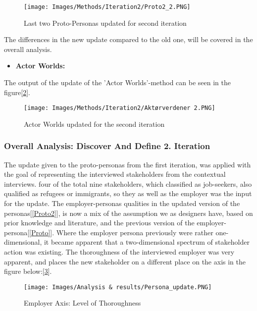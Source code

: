 \begin{figure}[H]
\caption{Last two Proto-Personas updated for second iteration}
\centering
\label{Proto2_2}
\texttt{[image: Images/Methods/Iteration2/Proto2\_2.PNG]}
\end{figure}

The differences in the new update compared to the old one, will be covered in the overall analysis.

\begin{itemize}
    \item \bf{Actor Worlds:}
\end{itemize}

The output of the update of the 'Actor Worlds'-method can be seen in the figure[\ref{Aktørverdener2}].

\begin{figure}[H]
\caption{Actor Worlds updated for the second iteration}
\centering
\label{Aktørverdener2}
\texttt{[image: Images/Methods/Iteration2/Aktørverdener 2.PNG]}
\end{figure}

\subsubsection{Overall Analysis: Discover And Define 2. Iteration}

The update given to the proto-personas from the first iteration, was applied with the goal of representing the interviewed stakeholders from the contextual interviews. four of the total nine stakeholders, which classified as job-seekers, also qualified as refugees or immigrants, so they as well as the employer was the input for the update. The employer-personas qualities in the updated version of the personas[\ref{Proto2}], is now a mix of the assumption we as designers have, based on prior knowledge and literature, and the previous version of the employer-persona[\ref{Proto}]. Where the employer persona previously were rather one-dimensional, it became apparent that a two-dimensional spectrum of stakeholder action was existing. The thoroughness of the interviewed employer was very apparent, and places the new stakeholder on a different place on the axis in the figure below:[\ref{persona_update}].

\begin{figure}[H]
\caption{Employer Axis: Level of Thoroughness}
\centering
\label{persona_update}
\texttt{[image: Images/Analysis \& results/Persona\_update.PNG]}
\end{figure}

